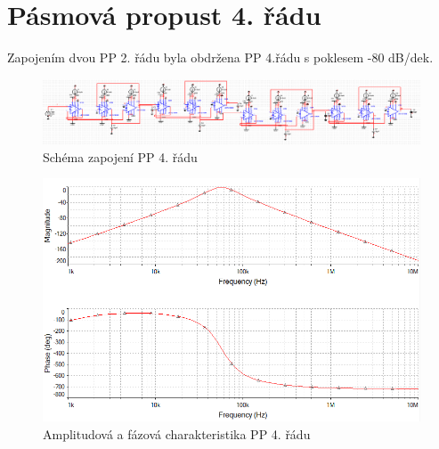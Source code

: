 \documentclass[twoside]{article}
\begin{document}
\section{Pásmová propust 4. řádu}\label{s:PP4}
\noindent Zapojením dvou PP 2. řádu byla obdržena PP 4.řádu s poklesem -80 dB/dek. 
\begin{figure}[H]
\centering
\includegraphics[scale=0.5]{PP4O.png}
\caption{Schéma zapojení PP 4. řádu}
\end{figure}
\begin{figure}[H]
\centering
\includegraphics[scale=0.6]{PP4O2.png}
\caption{Amplitudová a fázová charakteristika PP 4. řádu}
\end{figure}
\end{document}
